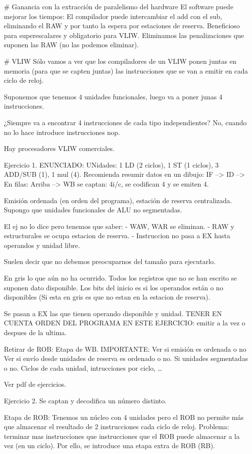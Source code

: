 # Ganancia con la extracción de paralelismo del hardware
El software puede mejorar los tiempos:
El compilador puede intercambiar el add con el sub, eliminando el RAW y por tanto la espera por estaciones de reserva.
Beneficioso para superescalares y obligatorio para VLIW. Eliminamos las penalizaciones que suponen las RAW (no las podemos eliminar).








# VLIW
Sólo vamos a ver que los compiladores de un VLIW ponen juntas en memoria (para que se capten juntas) las instrucciones que se van a emitir en cada ciclo de reloj.

Suponemos que tenemos 4 unidades funcionales, luego va a poner junas 4 instrucciones.

¿Siempre va a encontrar 4 instrucciones de cada tipo independientes?
No, cuando no lo hace introduce instrucciones nop.

Hay procesadores VLIW comerciales.









Ejercicio 1. ENUNCIADO:
UNidades: 1 LD (2 ciclos), 1 ST (1 ciclos), 3 ADD/SUB (1), 1 mul (4).
Recomienda resumir datos en un dibujo:
IF --> ID --> En filas: Arriba --> WB
se captan: 4i/c, se codifican 4 y se emiten 4.

Emisión ordenada (en orden del programa), estación de reserva centralizada.
Supongo que unidades funcionales de ALU no segmentadas.

El ej no lo dice pero tenemos que saber:
- WAW, WAR se eliminan.
- RAW y estructurales se ocupa estacion de reserva.
- Instruccion no pasa a EX hasta operandos y unidad libre.

Suelen decir que no debemos preocuparnos del tamaño para ejecutarlo.

En gris lo que aún no ha ocurrido.
Todos los registros que no se han escrito se suponen dato disponible.
Los bits del inicio es si los operandos están o no disponibles (Si esta en gris es que no estan en la estacion de reserva).



Se pasan a EX las que tienen operando disponible y unidad.
TENER EN CUENTA ORDEN DEL PROGRAMA EN ESTE EJERCICIO: emitir a la vez o despues de la ultima.


Retirar de ROB: Etapa de WB.
IMPORTANTE: 
    Ver si emisión es ordenada o no
    Ver si envío desde unidades de reserva es ordenado o no.
    Si unidades segmentadas o no.
    Ciclos de cada unidad, intrucciones por ciclo, \ldots


Ver pdf de ejercicios.

Ejercicio 2.
Se captan y decodifica un número distinto.

Etapa de ROB:
    Tenemos un núcleo con 4 unidades pero el ROB no permite más que almacenar el resultado de 2 instrucciones cada ciclo de reloj.
    Problema: terminar mas instrucciones que instrucciones que el ROB puede almacenar a la vez (en un ciclo).
    Por ello, se introduce una etapa extra de ROB (RB). 
